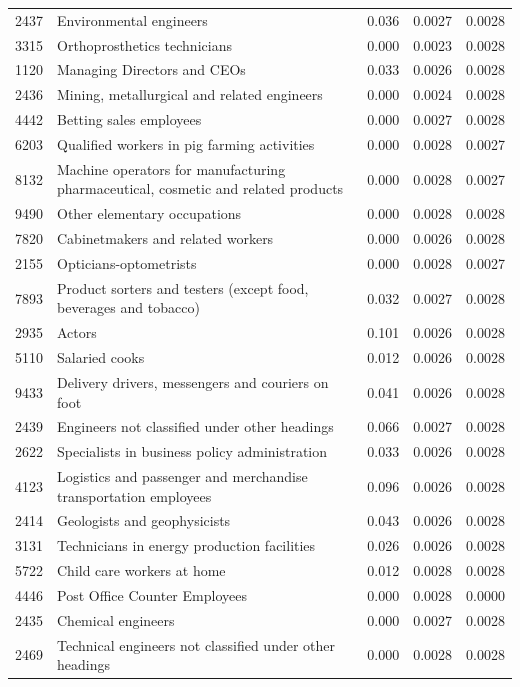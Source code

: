 \begin{longtable}{p{}>{\raggedright\arraybackslash}p{}rrr}
2437 & Environmental engineers & 0.036 & 0.0027 & 0.0028 \\
3315 & Orthoprosthetics technicians & 0.000 & 0.0023 & 0.0028 \\
1120 & Managing Directors and CEOs & 0.033 & 0.0026 & 0.0028 \\
2436 & Mining, metallurgical and related engineers & 0.000 & 0.0024 & 0.0028 \\
4442 & Betting sales employees & 0.000 & 0.0027 & 0.0028 \\
6203 & Qualified workers in pig farming activities & 0.000 & 0.0028 & 0.0027 \\
8132 & Machine operators for manufacturing pharmaceutical, cosmetic and related products & 0.000 & 0.0028 & 0.0027 \\
9490 & Other elementary occupations & 0.000 & 0.0028 & 0.0028 \\
7820 & Cabinetmakers and related workers & 0.000 & 0.0026 & 0.0028 \\
2155 & Opticians-optometrists & 0.000 & 0.0028 & 0.0027 \\
7893 & Product sorters and testers (except food, beverages and tobacco) & 0.032 & 0.0027 & 0.0028 \\
2935 & Actors & 0.101 & 0.0026 & 0.0028 \\
5110 & Salaried cooks & 0.012 & 0.0026 & 0.0028 \\
9433 & Delivery drivers, messengers and couriers on foot & 0.041 & 0.0026 & 0.0028 \\
2439 & Engineers not classified under other headings & 0.066 & 0.0027 & 0.0028 \\
2622 & Specialists in business policy administration & 0.033 & 0.0026 & 0.0028 \\
4123 & Logistics and passenger and merchandise transportation employees & 0.096 & 0.0026 & 0.0028 \\
2414 & Geologists and geophysicists & 0.043 & 0.0026 & 0.0028 \\
3131 & Technicians in energy production facilities & 0.026 & 0.0026 & 0.0028 \\
5722 & Child care workers at home & 0.012 & 0.0028 & 0.0028 \\
4446 & Post Office Counter Employees & 0.000 & 0.0028 & 0.0000 \\
2435 & Chemical engineers & 0.000 & 0.0027 & 0.0028 \\
2469 & Technical engineers not classified under other headings & 0.000 & 0.0028 & 0.0028 \\

\end{longtable}
